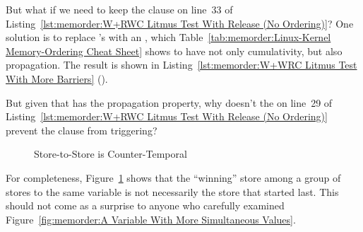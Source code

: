 But what if we need to keep the  clause on line~33 of
Listing~\ref{lst:memorder:W+RWC Litmus Test With Release (No Ordering)}?
One solution is to replace 's 
with an , which
Table~\ref{tab:memorder:Linux-Kernel Memory-Ordering Cheat Sheet}
shows to have not only cumulativity, but also propagation.
The result is shown in
Listing~\ref{lst:memorder:W+WRC Litmus Test With More Barriers}
().

\QuickQuiz{}
	But given that  has the propagation property,
	why doesn't the  on line~29 of
	Listing~\ref{lst:memorder:W+RWC Litmus Test With Release (No Ordering)}
	prevent the  clause from triggering?
 \QuickQuizEnd

\begin{figure}[tbp]
\centering
{}
\caption{Store-to-Store is Counter-Temporal}
\label{fig:memorder:Store-to-Store is Counter-Temporal}
\end{figure}

For completeness,
Figure~\ref{fig:memorder:Store-to-Store is Counter-Temporal}
shows that the ``winning'' store among a group of stores to the
same variable is not necessarily the store that started last.
This should not come as a surprise to anyone who carefully examined
Figure~\ref{fig:memorder:A Variable With More Simultaneous Values}.

